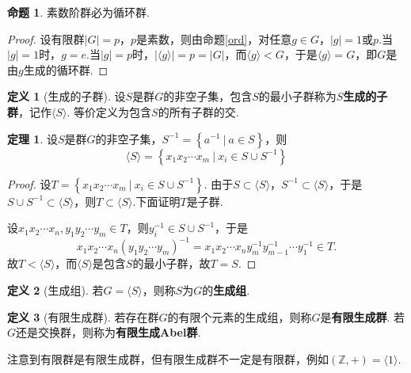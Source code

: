 \documentclass[12pt]{ctexart}
\theoremstyle{definition}
\newtheorem{definition}{定义}[section]
\newtheorem{theorem}{定理}[section]
\newtheorem{proposition}{命题}[section]
\theoremstyle{plain}
\begin{document}
\begin{proposition}
	素数阶群必为循环群.
\end{proposition}
\begin{proof}
	设有限群$|G|=p$，$p$是素数，则由命题\ref{ord}，对任意$g\in G$，$|g|=1$或$p$.当$|g|=1$时，$g=e$.当$|g|=p$时，$|\langle g\rangle|=p=|G|$，而$\langle g\rangle<G$，于是$\langle g\rangle=G$，即$G$是由$g$生成的循环群.
\end{proof}
\begin{definition}[生成的子群]
	设$S$是群$G$的非空子集，包含$S$的最小子群称为$S$\textbf{生成的子群}，记作$\langle S\rangle$. 等价定义为包含$S$的所有子群的交.
\end{definition}
\begin{theorem}
	设$S$是群$G$的非空子集，$S^{-1}=\left\{a^{-1}\ |\ a\in S\right\}$，则
	$$\langle S\rangle=\left\{x_1x_2\cdots x_m\ |\ x_i\in S\cup S^{-1}\right\}$$
\end{theorem}
\begin{proof}
	设$T=\left\{x_1x_2\cdots x_m\ |\ x_i\in S\cup S^{-1}\right\}$. 由于$S\subset\langle S\rangle$，$S^{-1}\subset\langle S\rangle$，于是$S\cup S^{-1}\subset\langle S\rangle$，则$T\subset\langle S\rangle$.下面证明$T$是子群.
	
	设$x_1x_2\cdots x_n,y_1y_2\cdots y_m\in T$，则$y_i^{-1}\in S\cup S^{-1}$，于是
	$$x_1x_2\cdots x_n(y_1y_2\cdots y_m)^{-1}=x_1x_2\cdots x_ny_m^{-1}y_{m-1}^{-1}\cdots y_1^{-1}\in T.$$
	故$T<\langle S\rangle$，而$\langle S\rangle$是包含$S$的最小子群，故$T=S$.
\end{proof}
\begin{definition}[生成组]
	若$G=\langle S\rangle$，则称$S$为$G$的\textbf{生成组}.
\end{definition}
\begin{definition}[有限生成群]
	若存在群$G$的有限个元素的生成组，则称$G$是\textbf{有限生成群}. 若$G$还是交换群，则称为\textbf{有限生成Abel群}.
\end{definition}
注意到有限群是有限生成群，但有限生成群不一定是有限群，例如$(\mathbb{Z},+)=\langle 1\rangle$.
\end{document}
